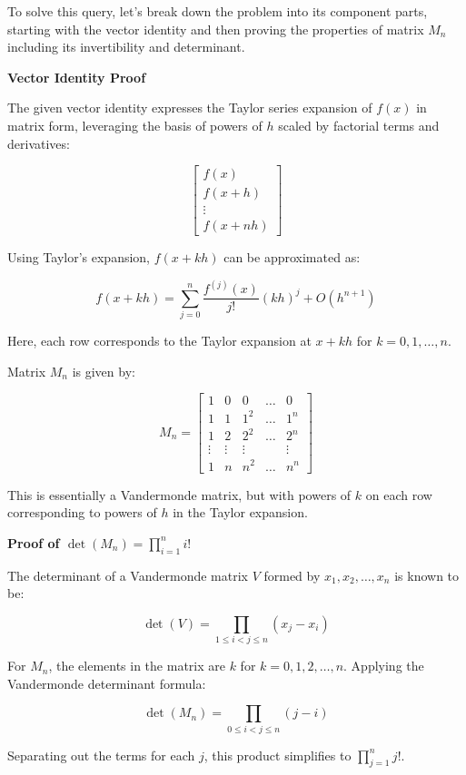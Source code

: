 \documentclass[8pt]{article}
\begin{document}
To solve this query, let's break down the problem into its component parts, starting with the vector identity and then proving the properties of matrix \( M_n \) including its invertibility and determinant.

\textbf{Vector Identity Proof}

The given vector identity expresses the Taylor series expansion of \( f(x) \) in matrix form, leveraging the basis of powers of \( h \) scaled by factorial terms and derivatives:

\[
\begin{bmatrix}
f(x) \\
f(x + h) \\
\vdots \\
f(x + nh)
\end{bmatrix}
\]

Using Taylor's expansion, \( f(x + kh) \) can be approximated as:

\[
f(x + kh) = \sum_{j=0}^n \frac{f^{(j)}(x)}{j!} (kh)^j + O(h^{n+1})
\]

Here, each row corresponds to the Taylor expansion at \( x + kh \) for \( k = 0, 1, \ldots, n \).

Matrix \( M_n \) is given by:

\[
M_n = \begin{bmatrix}
1 & 0 & 0 & \dots & 0 \\
1 & 1 & 1^2 & \dots & 1^n \\
1 & 2 & 2^2 & \dots & 2^n \\
\vdots & \vdots & \vdots & & \vdots \\
1 & n & n^2 & \dots & n^n
\end{bmatrix}
\]

This is essentially a Vandermonde matrix, but with powers of \( k \) on each row corresponding to powers of \( h \) in the Taylor expansion.

\textbf{Proof of \( \det(M_n) = \prod_{i=1}^n i! \)}

The determinant of a Vandermonde matrix \( V \) formed by \( x_1, x_2, \ldots, x_n \) is known to be:

\[
\det(V) = \prod_{1 \leq i < j \leq n} (x_j - x_i)
\]

For \( M_n \), the elements in the matrix are \( k \) for \( k = 0, 1, 2, \ldots, n \). Applying the Vandermonde determinant formula:

\[
\det(M_n) = \prod_{0 \leq i < j \leq n} (j - i)
\]

Separating out the terms for each \( j \), this product simplifies to \( \prod_{j=1}^n j! \).
\end{document}
